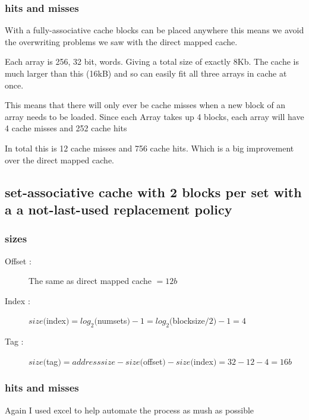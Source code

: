 \documentclass[12pt]{article}
\begin{document}
			\subsubsection{hits and misses}
			
				With a fully-associative cache blocks can be placed anywhere this means we avoid the overwriting problems we saw with the direct mapped cache. 

				Each array is 256, 32 bit, words. Giving a total size of exactly 8Kb. The cache is much larger than this (16kB) and so can easily fit all three arrays in cache at once.

				This means that there will only ever be cache misses when a new block of an array needs to be loaded. Since each Array takes up 4 blocks, each array will have 4 cache misses and 252 cache hits 

				In total this is 12 cache misses and 756 cache hits. Which is a big improvement over the direct mapped cache.

		\subsection{set-associative cache with 2 blocks per set with a a not-last-used replacement policy}

			\subsubsection{sizes}
			
				\begin{description}
					\item[Offset : ] The same as direct mapped cache $ = 12 b$
					\item[Index : ] $size($index$) = log_2($numsets$) -1 = log_2($blocksize$/2) -1 = 4$
					\item[Tag : ] $size($tag$) = addresssize- size($offset$) - size($index$) = 32 - 12 -4 = 16b$
				\end{description}

			\subsubsection{hits and misses}

			Again I used excel to help automate the process as mush as possible
\end{document}
